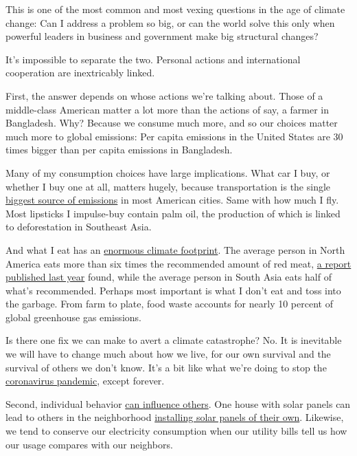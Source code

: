 This is one of the most common and most vexing questions in the age of
climate change: Can I address a problem so big, or can the world solve
this only when powerful leaders in business and government make big
structural changes?

It's impossible to separate the two. Personal actions and international
cooperation are inextricably linked.

First, the answer depends on whose actions we're talking about. Those of
a middle-class American matter a lot more than the actions of say, a
farmer in Bangladesh. Why? Because we consume much more, and so our
choices matter much more to global emissions: Per capita emissions in
the United States are 30 times bigger than per capita emissions in
Bangladesh.

Many of my consumption choices have large implications. What car I buy,
or whether I buy one at all, matters hugely, because transportation is
the single
\href{https://www.nytimes3xbfgragh.onion/interactive/2019/10/10/climate/driving-emissions-map.html}{biggest
source of emissions} in most American cities. Same with how much I fly.
Most lipsticks I impulse-buy contain palm oil, the production of which
is linked to deforestation in Southeast Asia.

And what I eat has an
\href{https://www.nytimes3xbfgragh.onion/interactive/2019/04/30/dining/climate-change-food-eating-habits.html}{enormous
climate footprint}. The average person in North America eats more than
six times the recommended amount of red meat,
\href{https://www.nytimes3xbfgragh.onion/2019/01/16/climate/meat-environment-climate-change.html}{a
report published last year} found, while the average person in South
Asia eats half of what's recommended. Perhaps most important is what I
don't eat and toss into the garbage. From farm to plate, food waste
accounts for nearly 10 percent of global greenhouse gas emissions.

Is there one fix we can make to avert a climate catastrophe? No. It is
inevitable we will have to change much about how we live, for our own
survival and the survival of others we don't know. It's a bit like what
we're doing to stop the
\href{https://www.nytimes3xbfgragh.onion/2020/03/12/climate/climate-change-coronavirus-lessons.html}{coronavirus
pandemic}, except forever.

Second, individual behavior
\href{https://www.nature.com/articles/s41560-019-0541-9}{can influence
others}. One house with solar panels can lead to others in the
neighborhood
\href{https://pubsonline.informs.org/doi/10.1287/mksc.1120.0727}{installing
solar panels of their own}. Likewise, we tend to conserve our
electricity consumption when our utility bills tell us how our usage
compares with our neighbors.

